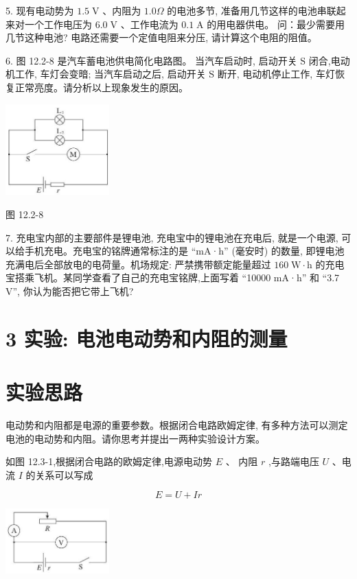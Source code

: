 \documentclass[10pt]{article}
\begin{document}
5. 现有电动势为 \({1.5}\mathrm{\;V}\) 、内阻为 \({1.0\Omega }\) 的电池多节, 准备用几节这样的电池串联起来对一个工作电压为 \({6.0}\mathrm{\;V}\) 、工作电流为 \({0.1}\mathrm{\;A}\) 的用电器供电。 问：最少需要用几节这种电池? 电路还需要一个定值电阻来分压, 请计算这个电阻的阻值。

6. 图 12.2-8 是汽车蓄电池供电简化电路图。 当汽车启动时, 启动开关 \(\mathrm{S}\) 闭合,电动机工作, 车灯会变暗; 当汽车启动之后, 启动开关 \(\mathrm{S}\) 断开, 电动机停止工作, 车灯恢复正常亮度。请分析以上现象发生的原因。

\begin{center}
\includegraphics[max width=0.3\textwidth]{images/01911d5f-8e38-70c0-b5b8-2b399bd115b6_93_884769.jpg}
\end{center}

图 12.2-8

7. 充电宝内部的主要部件是锂电池, 充电宝中的锂电池在充电后, 就是一个电源, 可以给手机充电。充电宝的铭牌通常标注的是 “mA·h” (毫安时) 的数量, 即锂电池充满电后全部放电的电荷量。机场规定: 严禁携带额定能量超过 \({160}\mathrm{\;W} \cdot \mathrm{h}\) 的充电宝搭乘飞机。某同学查看了自己的充电宝铭牌,上面写着 “10000 mA·h” 和 “3.7 V”, 你认为能否把它带上飞机?

\section*{3 实验: 电池电动势和内阻的测量}

\section*{实验思路}

电动势和内阻都是电源的重要参数。根据闭合电路欧姆定律, 有多种方法可以测定电池的电动势和内阻。请你思考并提出一两种实验设计方案。

如图 12.3-1,根据闭合电路的欧姆定律,电源电动势 \(E\) 、 内阻 \(r\) ,与路端电压 \(U\) 、电流 \(I\) 的关系可以写成

\[
E = U + {Ir} \tag{1}
\]

\begin{center}
\includegraphics[max width=0.3\textwidth]{images/01911d5f-8e38-70c0-b5b8-2b399bd115b6_94_211160.jpg}
\end{center}
\end{document}
